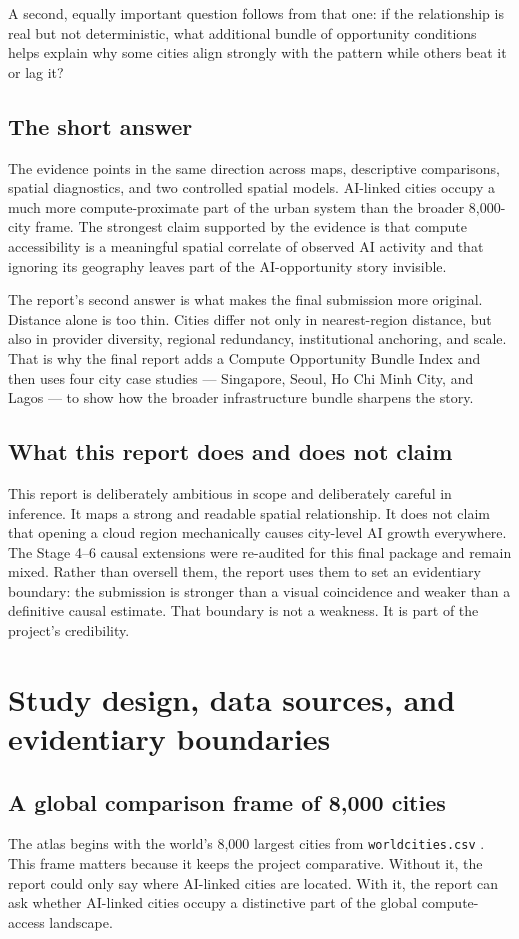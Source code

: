\documentclass[11pt]{article}
\begin{document}
A second, equally important question follows from that one: if the relationship is real but not deterministic, what additional bundle of opportunity conditions helps explain why some cities align strongly with the pattern while others beat it or lag it?

\subsection{The short answer}
The evidence points in the same direction across maps, descriptive comparisons, spatial diagnostics, and two controlled spatial models. AI-linked cities occupy a much more compute-proximate part of the urban system than the broader 8,000-city frame. The strongest claim supported by the evidence is that compute accessibility is a meaningful spatial correlate of observed AI activity and that ignoring its geography leaves part of the AI-opportunity story invisible.

The report’s second answer is what makes the final submission more original. Distance alone is too thin. Cities differ not only in nearest-region distance, but also in provider diversity, regional redundancy, institutional anchoring, and scale. That is why the final report adds a Compute Opportunity Bundle Index and then uses four city case studies --- Singapore, Seoul, Ho Chi Minh City, and Lagos --- to show how the broader infrastructure bundle sharpens the story.

\subsection{What this report does and does not claim}
This report is deliberately ambitious in scope and deliberately careful in inference. It maps a strong and readable spatial relationship. It does not claim that opening a cloud region mechanically causes city-level AI growth everywhere. The Stage 4--6 causal extensions were re-audited for this final package and remain mixed. Rather than oversell them, the report uses them to set an evidentiary boundary: the submission is stronger than a visual coincidence and weaker than a definitive causal estimate. That boundary is not a weakness. It is part of the project’s credibility.

\section{Study design, data sources, and evidentiary boundaries}
\subsection{A global comparison frame of 8,000 cities}
The atlas begins with the world’s 8,000 largest cities from \texttt{worldcities.csv} \citep{worldcities}. This frame matters because it keeps the project comparative. Without it, the report could only say where AI-linked cities are located. With it, the report can ask whether AI-linked cities occupy a distinctive part of the global compute-access landscape.
\end{document}
